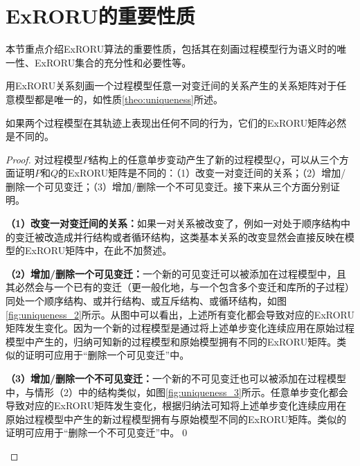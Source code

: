 \section{ExRORU的重要性质}\label{sec:exroru_properties}
本节重点介绍ExRORU算法的重要性质，包括其在刻画过程模型行为语义时的唯一性、ExRORU集合的充分性和必要性等。

用ExRORU关系刻画一个过程模型任意一对变迁间的关系产生的关系矩阵对于任意模型都是唯一的，如性质\ref{theo:uniqueness}所述。

\begin{theorem}[唯一性]\label{theo:uniqueness}
如果两个过程模型在其轨迹上表现出任何不同的行为，它们的ExRORU矩阵必然是不同的。
\end{theorem}

\begin{proof}
对过程模型$P$结构上的任意单步变动产生了新的过程模型$Q$，可以从三个方面证明$P$和$Q$的ExRORU矩阵是不同的：（1）改变一对变迁间的关系；（2）增加/删除一个可见变迁；（3）增加/删除一个不可见变迁。接下来从三个方面分别证明。

\textbf{（1）改变一对变迁间的关系：}如果一对关系被改变了，例如一对处于顺序结构中的变迁被改造成并行结构或者循环结构，这类基本关系的改变显然会直接反映在模型的ExRORU矩阵中，在此不加赘述。

\textbf{（2）增加/删除一个可见变迁：}一个新的可见变迁可以被添加在过程模型中，且其必然会与一个已有的变迁（更一般化地，与一个包含多个变迁和库所的子过程）同处一个顺序结构、或并行结构、或互斥结构、或循环结构，如图\ref{fig:uniqueness_2}所示。从图中可以看出，上述所有变化都会导致对应的ExRORU矩阵发生变化。因为一个新的过程模型是通过将上述单步变化连续应用在原始过程模型中产生的，归纳可知新的过程模型和原始模型拥有不同的ExRORU矩阵。类似的证明可应用于“删除一个可见变迁”中。

\textbf{（3）增加/删除一个不可见变迁：}一个新的不可见变迁也可以被添加在过程模型中，与情形（2）中的结构类似，如图\ref{fig:uniqueness_3}所示。任意单步变化都会导致对应的ExRORU矩阵发生变化，根据归纳法可知将上述单步变化连续应用在原始过程模型中产生的新过程模型拥有与原始模型不同的ExRORU矩阵。类似的证明可应用于“删除一个不可见变迁”中。\qed

\begin{figure}[htbp]
  \centering


\end{figure}
\end{proof}
